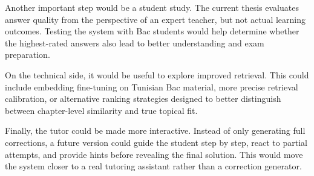 Another important step would be a student study. The current thesis
evaluates answer quality from the perspective of an expert teacher, but not
actual learning outcomes. Testing the system with Bac students would help
determine whether the highest-rated answers also lead to better
understanding and exam preparation.

On the technical side, it would be useful to explore improved retrieval.
This could include embedding fine-tuning on Tunisian Bac material, more
precise retrieval calibration, or alternative ranking strategies designed to
better distinguish between chapter-level similarity and true topical fit.

Finally, the tutor could be made more interactive. Instead of only
generating full corrections, a future version could guide the student
step by step, react to partial attempts, and provide hints before revealing
the final solution. This would move the system closer to a real tutoring
assistant rather than a correction generator.
